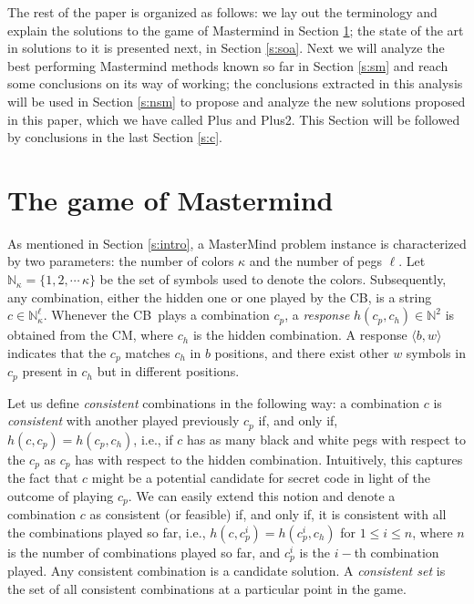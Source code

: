 \documentclass[preprint,12pt]{elsarticle}
\def\codemaker{CM}
\def\codebreaker{CB}
\begin{document}
The rest of the paper is organized as follows: we lay out the
terminology and explain the solutions to the game of Mastermind in
Section \ref{s:mm}; the state of the art in solutions to it is
presented next, in Section \ref{s:soa}. Next we will analyze the
best performing Mastermind methods known so far in Section  \ref{s:sm}
and reach some conclusions on its way of working; the conclusions
extracted in this analysis will be used in Section \ref{s:nsm} to
propose and analyze the new solutions proposed in this paper, which we
have called Plus and Plus2. This Section will be followed by
conclusions in the last Section \ref{s:c}.

\section{The game of Mastermind}
\label{s:mm}

As mentioned in Section \ref{s:intro}, a MasterMind problem instance is
characterized by two parameters: the number of colors $\kappa$
and the number of pegs $\ell$. Let
$\mathbb{N}_\kappa=\{1,2,\cdots\,\kappa\}$ be the set of symbols
used to denote the colors. Subsequently, any combination, either the
hidden one or one played by the \codebreaker, is a string $c\in
\mathbb{N}_\kappa^\ell$. Whenever the \codebreaker\  plays a
combination $c_p$, a \emph{response} $h(c_p,c_h)\in\mathbb{N}^2$ is
obtained from the \codemaker, where $c_h$ is the hidden combination.
A response $\langle b, w \rangle$ indicates that the $c_p$ matches
$c_h$ in $b$ positions, and there exist other $w$ symbols in $c_p$
present in $c_h$ but in different positions.

Let us define {\em consistent} combinations \cite{o1991mastermind} in
the following way: a 
combination $c$ is \emph{consistent} with another played previously 
$c_p$ if, and only if, $h(c,c_p)=h(c_p,c_h)$, i.e., if $c$ has as
many black and white pegs with respect to the $c_p$ as $c_p$ has
with respect to the hidden combination. Intuitively, this captures
the fact that $c$ might be a potential candidate for secret code in light of the outcome of playing $c_p$. We can easily
extend this notion and denote a combination $c$ as consistent (or
feasible) if, and only if, it is consistent with all the combinations
played so far, i.e., $h(c,c^i_p) = h(c^i_p, c_h)$ for $1 \leqslant i \leqslant n$,
where $n$ is the number of combinations played so far, and $c^i_p$
is the $i-$th combination played. Any consistent combination is a
candidate solution. A {\em consistent set} is the set of all
consistent combinations at a particular point in the game. 
\end{document}
